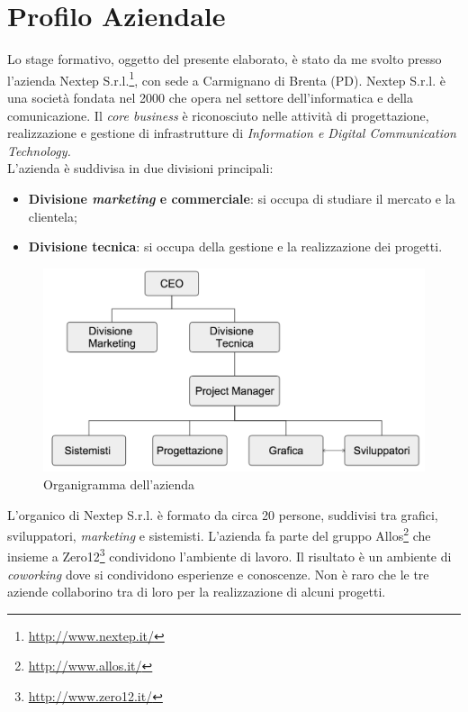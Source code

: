 
\chapter{Profilo Aziendale}
\label{cap:introduzione}

Lo stage formativo, oggetto del presente elaborato, è stato da me svolto presso l'azienda Nextep S.r.l.\footnote{\url{http://www.nextep.it/}}, con sede a Carmignano di Brenta (PD). Nextep S.r.l. è una società fondata nel 2000 che opera nel settore dell'informatica e della comunicazione. Il \textit{core business} è riconosciuto nelle attività di progettazione, realizzazione e gestione di infrastrutture di \textit{Information e Digital Communication Technology.}\\
L'azienda è suddivisa in due divisioni principali:
\begin{itemize}
	\item \textbf{Divisione \textit{marketing} e commerciale}: si occupa di studiare il mercato e la clientela;
	\item \textbf{Divisione tecnica}: si occupa della gestione e la realizzazione dei progetti.
\end{itemize}

\begin{figure}[h]
\centering
\includegraphics[width=0.8\linewidth]{immagini/organigramma}
\caption[Organigramma dell'azienda]{Organigramma dell'azienda}
\label{fig:logo-nextep}
\end{figure}

L'organico di Nextep S.r.l. è formato da circa 20 persone, suddivisi tra grafici, sviluppatori, \textit{marketing} e sistemisti. L'azienda fa parte del gruppo Allos\footnote{\url{http://www.allos.it/}} che insieme a Zero12\footnote{\url{http://www.zero12.it/}} condividono l'ambiente di lavoro. Il risultato è un ambiente di \textit{coworking} dove si condividono esperienze e conoscenze. Non è raro che le tre aziende collaborino tra di loro per la realizzazione di alcuni progetti.


